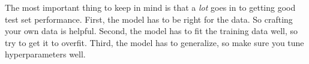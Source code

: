 The most important thing to keep in mind is that a \emph{lot} goes in
to getting good test set performance.  First, the model has to be
right for the data.  So crafting your own data is helpful.  Second,
the model has to fit the training data well, so try to get it to
overfit.  Third, the model has to generalize, so make sure you tune
hyperparameters well.


\begin{comment}
\section{Human Knowledge is Everywhere}

\TODOFigure{prac:boc}{BOC repr of one positive and one negative review}

Alternatively, one can use bags of characters, a representation much
like bag of pixels.  As you might expect, this is a terrible
representation for most text categorization problems.  However,
instead of using a ``bag of X'' representation, one can you a ``bag of
(sequences of X)'' representation.  For example, we could have one
feature for any pair of adjacent words\sidenote{This might help
  recognize that ``real estate'' is different than ``real'' +
  ``estate''.} or adjacent characters.  As these sequences grow
longer, the size of the feature space grows, but we begin to see more
meaningful units.  Figure~\ref{fig:prac:boseq} shows \emph{test
  performance} for both bag of words and bag of characters, for
different sequence lengths.  As you can see, once the character
sequence length hits $5$, it performs roughly equally to bag of
words (this is because most words are about $4$ characters long, plus
a space).  As the sequence lengths grow, the models begin to overfit
and performance drops.

One can take this idea further.  Instead of sequences of characters,
we can consider sequences of \emph{bits}.  

\thinkaboutit{Can you think of a text categorization problem where bag
  of characters might actually be a reasonable representation?}

One issue in language is that words are often not the right level of
granularity for classification.  For instance, ``real estate'' is very
different than ``real'' + ``estate'', so in one sense a word is too
small of a unit.  On the other hand, ``fortunate'' and ``fortunately''
are really not very different, so a word can also be too large of a
unit.  A possible way to address this is to either move ``up'' and
consider \emph{sequences of words}, in addition to single words.
Another possibility is to move ``down'' and consider \emph{sequences
  of characters}.


\end{comment}
